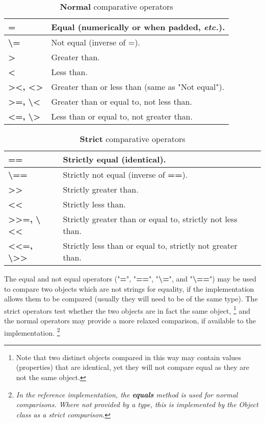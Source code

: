 \begin{table}\caption{\textbf{Normal} comparative
    operators}\label{table:Normal Comparators}
\begin{tabularx}{\textwidth}{>{\bfseries}lX}
\toprule
=&Equal (numerically or when padded, \emph{etc.}).
\\\midrule
\textbackslash =&Not equal (inverse of =).
\\\midrule
>&Greater than.
\\\midrule
<&Less than.
\\\midrule
><, <>&Greater than or less than (same as "Not equal").
\\\midrule
>=, \textbackslash <&Greater than or equal to, not less than.
\\\midrule
<=, \textbackslash >&Less than or equal to, not greater than.
\\\bottomrule
\end{tabularx}
\end{table}
\begin{table}\caption{\textbf{Strict} comparative  operators}\label{table:Strict Comparators}
\begin{tabularx}{\textwidth}{>{\bfseries}lX}
\toprule
==&Strictly equal (identical).
\\\midrule
\textbackslash ==&Strictly not equal (inverse of \textbf{==}).
\\\midrule
>>&Strictly greater than.
\\\midrule
<<&Strictly less than.
\\\midrule
>>=, \textbackslash <<&Strictly greater than or equal to, strictly not
less than.
\\\midrule
<<=, \textbackslash >>&Strictly less than or equal to, strictly not
greater than.
\\\bottomrule
\end{tabularx}
\end{table}
The equal and not equal operators ("\textbf{=}",
"\textbf{==}", "\textbf{\textbackslash =}", and
"\textbf{\textbackslash ==}") may be used to compare two objects which
are not strings for equality, if the implementation allows them to be
compared (usually they will need to be of the same type).  The strict
operators test whether the two objects are in fact the same object,
\footnote{
Note that two distinct objects compared in this way may contain values
(properties) that are identical, yet they will not compare equal as they
are not the same object.
}
and the normal operators may provide a more relaxed comparison, if
available to the implementation.
\footnote{
\emph{In the reference implementation, the \textbf{equals} method is
used for normal comparisons.  Where not provided by a type, this is
implemented by the Object class as a strict comparison.}
}
 
